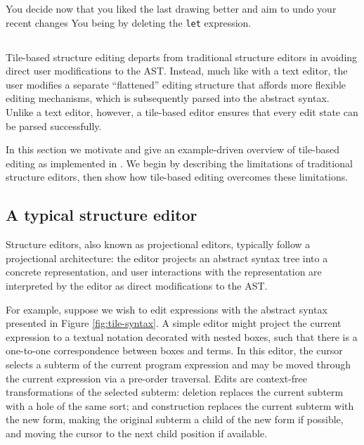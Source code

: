 You decide now that you liked the last drawing better
and aim to undo your recent changes
You being by deleting the \texttt{let} expression.


\subsection{}

Tile-based structure editing departs from traditional
structure editors in avoiding direct user modifications
to the AST.
Instead, much like with a text editor, the user modifies a separate
``flattened'' editing structure that affords more flexible
editing mechanisms, which is subsequently parsed into the
abstract syntax.
Unlike a text editor, however, a tile-based editor ensures
that every edit state can be parsed successfully.

In this section we motivate and give an example-driven
overview of tile-based editing as implemented
in \tylr. We begin by describing the limitations of
traditional structure editors, then show how tile-based
editing overcomes these limitations.

\subsection{A typical structure editor} \label{sec:simple-editor}

Structure editors, also known as projectional editors, typically
follow a projectional architecture: the editor projects an
abstract syntax tree into a concrete representation,
and user interactions with the representation are interpreted
by the editor as direct modifications to the AST.

For example, suppose we wish to edit expressions with the abstract
syntax presented in Figure \ref{fig:tile-syntax}.
A simple editor might project the current expression
to a textual notation decorated with nested boxes, such
that there is a one-to-one correspondence between
boxes and terms. 
In this editor, the cursor selects a subterm of the
current program expression and may be moved through
the current expression via a pre-order traversal.
Edits are context-free transformations
of the selected subterm:
  deletion replaces the current subterm with
    a hole of the same sort; and
  construction replaces the current subterm
    with the new form, making the original subterm
    a child of the new form if possible, and moving
    the cursor to the next child position if available.


